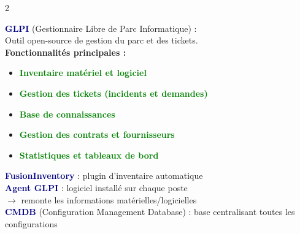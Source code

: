 \documentclass[a4paper,10pt]{article}
\newcommand{\key}[1]{\textbf{\textcolor{navy}{#1}}}
\newcommand{\ok}[1]{\textbf{\textcolor{green}{#1}}}
\begin{document}
\begin{multicols}{2}
\begin{tcolorbox}[basebox, colframe=green, title=2. GLPI — Présentation]
\key{GLPI} (Gestionnaire Libre de Parc Informatique) :\\
Outil open-source de gestion du parc et des tickets.\\[4pt]
\textbf{Fonctionnalités principales :}
\begin{itemize}
  \item \ok{Inventaire matériel et logiciel}
  \item \ok{Gestion des tickets (incidents et demandes)}
  \item \ok{Base de connaissances}
  \item \ok{Gestion des contrats et fournisseurs}
  \item \ok{Statistiques et tableaux de bord}
\end{itemize}
\vspace{4pt}
\key{FusionInventory} : plugin d'inventaire automatique \\
\key{Agent GLPI} : logiciel installé sur chaque poste \\
\quad $\to$ remonte les informations matérielles/logicielles \\[4pt]
\key{CMDB} (Configuration Management Database) : base centralisant toutes les configurations
\end{tcolorbox}


\end{multicols}
\end{document}
